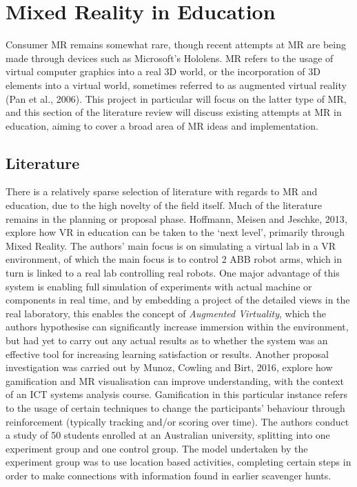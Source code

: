 \documentclass[11pt]{report}
\begin{document}
\section{Mixed Reality in Education}
Consumer MR remains somewhat rare, though recent attempts at MR are being made through devices such as Microsoft's Hololens. MR refers to the usage of virtual computer graphics into a real 3D world, or the incorporation of 3D elements into a virtual world, sometimes referred to as augmented virtual reality (Pan et al., 2006\cite{Pan2006}). This project in particular will focus on the latter type of MR, and this section of the literature review will discuss existing attempts at MR in education, aiming to cover a broad area of MR ideas and implementation.
\subsection{Literature}
There is a relatively sparse selection of literature with regards to MR and education, due to the high novelty of the field itself. Much of the literature remains in the planning or proposal phase. Hoffmann, Meisen and Jeschke, 2013\cite{Hoffmann2013}, explore how VR in education can be taken to the `next level', primarily through Mixed Reality. The authors' main focus is on simulating a virtual lab in a VR environment, of which the main focus is to control 2 ABB robot arms, which in turn is linked to a real lab controlling real robots. One major advantage of this system is enabling full simulation of experiments with actual machine or components in real time, and by embedding a project of the detailed views in the real laboratory, this enables the concept of \textit{Augmented Virtuality}, which the authors hypothesise can significantly increase immersion within the environment, but had yet to carry out any actual results as to whether the system was an effective tool for increasing learning satisfaction or results. Another proposal investigation was carried out by 
Munoz, Cowling and Birt, 2016\cite{Munoz2016}, explore how gamification and MR visualisation can improve understanding, with the context of an ICT systems analysis course. Gamification in this particular instance refers to the usage of certain techniques to change the participants' behaviour through reinforcement (typically tracking and/or scoring over time). The authors conduct a study of 50 students enrolled at an Australian university, splitting into one experiment group and one control group. The model undertaken by the experiment group was to use location based activities, completing certain steps in order to make connections with information found in earlier scavenger hunts.
\end{document}
